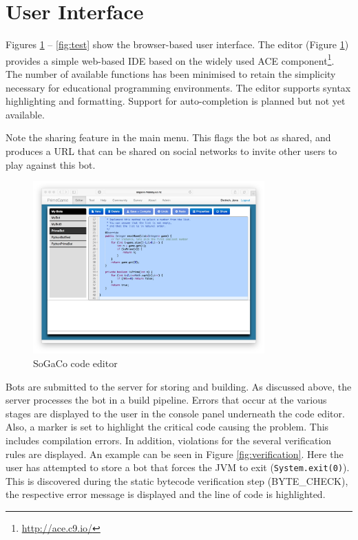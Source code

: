 \section{User Interface}

Figures \ref{fig:editor} -- \ref{fig:test} show the browser-based user interface. The editor (Figure \ref{fig:editor}) provides a simple web-based IDE based on the widely used ACE component\footnote{\url{http://ace.c9.io/}}. The number of available functions has been minimised to retain the
simplicity necessary for educational programming environments. The editor supports syntax highlighting and formatting. 
Support for auto-completion is planned but not yet available. 

Note the sharing feature in the main menu. This flags the bot as shared, and produces a URL that can be shared on social networks to invite other users to play against this bot. 

\begin{figure}
	\includegraphics[width=8.9cm]{figures/editor.pdf}
	\caption{SoGaCo code editor}
	\label{fig:editor}
\end{figure}

Bots are submitted to the server for storing and building. As discussed above, the server processes the bot in a build pipeline. Errors that occur at the various stages are displayed to the user in the console panel underneath the code editor. Also, a marker is set to highlight the critical code causing the problem. This includes compilation errors. In addition, violations for the several verification rules are displayed. An example can be seen in Figure \ref{fig:verification}. Here the user has attempted to store a bot that forces the JVM to exit (\texttt{System.exit(0)}). This is discovered during the static bytecode verification step (BYTE\_CHECK),  the respective error message is displayed and the line of code is highlighted.



